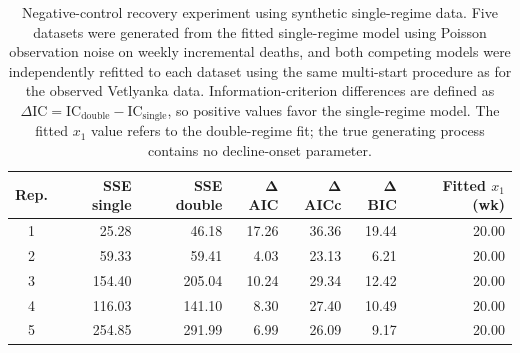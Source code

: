 \begin{table}[t]
    \centering
    \small
    \caption{Negative-control recovery experiment using synthetic single-regime data. Five datasets were generated from the fitted single-regime model using Poisson observation noise on weekly incremental deaths, and both competing models were independently refitted to each dataset using the same multi-start procedure as for the observed Vetlyanka data. Information-criterion differences are defined as $\Delta\mathrm{IC}=\mathrm{IC}_{\mathrm{double}}-\mathrm{IC}_{\mathrm{single}}$, so positive values favor the single-regime model. The fitted $x_1$ value refers to the double-regime fit; the true generating process contains no decline-onset parameter.}
    \begin{tabular}{crrrrrr}
        \toprule
        \textbf{Rep.} & \textbf{SSE single} & \textbf{SSE double} & $\boldsymbol{\Delta}$\textbf{AIC} & $\boldsymbol{\Delta}$\textbf{AICc} & $\boldsymbol{\Delta}$\textbf{BIC} & \textbf{Fitted $x_1$ (wk)} \\
        \midrule
        1 & 25.28 & 46.18 & 17.26 & 36.36 & 19.44 & 20.00 \\
        2 & 59.33 & 59.41 & 4.03 & 23.13 & 6.21 & 20.00 \\
        3 & 154.40 & 205.04 & 10.24 & 29.34 & 12.42 & 20.00 \\
        4 & 116.03 & 141.10 & 8.30 & 27.40 & 10.49 & 20.00 \\
        5 & 254.85 & 291.99 & 6.99 & 26.09 & 9.17 & 20.00 \\
        \bottomrule
    \end{tabular}
    \label{tab:negative_control_recovery}
\end{table}